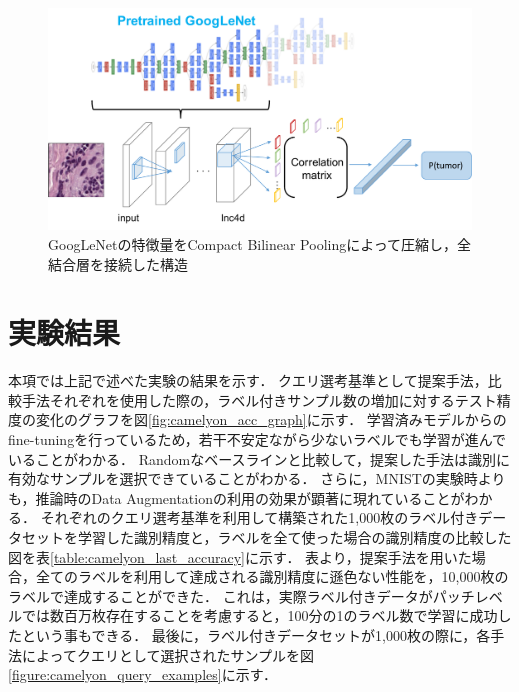 \begin{figure}[t!]
  \begin{center}
   \includegraphics[width=12cm]{figures/googlenet_cbp.pdf}
  \end{center}
 \caption{\label{fig:googlenet_cbp}GoogLeNetの特徴量をCompact Bilinear Poolingによって圧縮し，全結合層を接続した構造}
\end{figure}

\section{実験結果}
本項では上記で述べた実験の結果を示す．
クエリ選考基準として提案手法，比較手法それぞれを使用した際の，ラベル付きサンプル数の増加に対するテスト精度の変化のグラフを図\ref{fig:camelyon_acc_graph}に示す．
学習済みモデルからのfine-tuningを行っているため，若干不安定ながら少ないラベルでも学習が進んでいることがわかる．
Randomなベースラインと比較して，提案した手法は識別に有効なサンプルを選択できていることがわかる．
さらに，MNISTの実験時よりも，推論時のData Augmentationの利用の効果が顕著に現れていることがわかる．
それぞれのクエリ選考基準を利用して構築された1,000枚のラベル付きデータセットを学習した識別精度と，ラベルを全て使った場合の識別精度の比較した図を表\ref{table:camelyon_last_accuracy}に示す．
表より，提案手法を用いた場合，全てのラベルを利用して達成される識別精度に遜色ない性能を，10,000枚のラベルで達成することができた．
これは，実際ラベル付きデータがパッチレベルでは数百万枚存在することを考慮すると，100分の1のラベル数で学習に成功したという事もできる．
最後に，ラベル付きデータセットが1,000枚の際に，各手法によってクエリとして選択されたサンプルを図\ref{figure:camelyon_query_examples}に示す．

